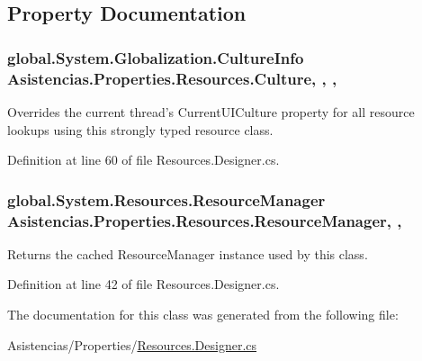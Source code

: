 \subsection{Property Documentation}
\hypertarget{class_asistencias_1_1_properties_1_1_resources_a1bc74ad8c5a5653ef56301173549a692}{
\subsubsection[{Culture}]{\setlength{\rightskip}{0pt plus 5cm}global.\-System.\-Globalization.\-Culture\-Info Asistencias.\-Properties.\-Resources.\-Culture\hspace{0.3cm}{\ttfamily [static]}, {\ttfamily [get]}, {\ttfamily [set]}, {\ttfamily [package]}}}\label{class_asistencias_1_1_properties_1_1_resources_a1bc74ad8c5a5653ef56301173549a692}


Overrides the current thread's Current\-U\-I\-Culture property for all resource lookups using this strongly typed resource class. 



Definition at line 60 of file Resources.\-Designer.\-cs.

\hypertarget{class_asistencias_1_1_properties_1_1_resources_a26dd1c170bed2b6e8577ff64c8e8fd9f}{
\subsubsection[{Resource\-Manager}]{\setlength{\rightskip}{0pt plus 5cm}global.\-System.\-Resources.\-Resource\-Manager Asistencias.\-Properties.\-Resources.\-Resource\-Manager\hspace{0.3cm}{\ttfamily [static]}, {\ttfamily [get]}, {\ttfamily [package]}}}\label{class_asistencias_1_1_properties_1_1_resources_a26dd1c170bed2b6e8577ff64c8e8fd9f}


Returns the cached Resource\-Manager instance used by this class. 



Definition at line 42 of file Resources.\-Designer.\-cs.



The documentation for this class was generated from the following file\-:\begin{DoxyCompactItemize}
\item 
Asistencias/\-Properties/\hyperlink{_asistencias_2_properties_2_resources_8_designer_8cs}{Resources.\-Designer.\-cs}\end{DoxyCompactItemize}
